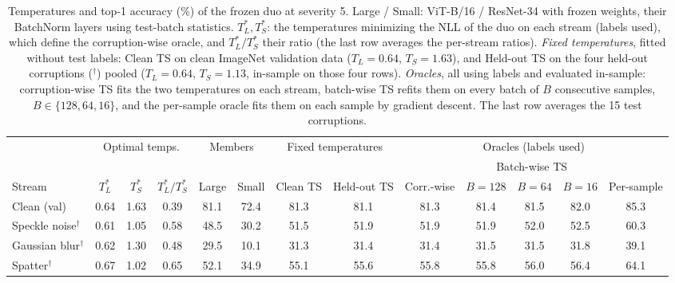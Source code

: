 \begin{table}[t]
    \centering
    \small
    \setlength{\tabcolsep}{4.5pt}
    \caption{Temperatures and top-1 accuracy (\%) of the frozen duo at severity 5. Large / Small: ViT-B/16 / ResNet-34 with frozen weights, their BatchNorm layers using test-batch statistics. $T_L^*, T_S^*$: the temperatures minimizing the NLL of the duo on each stream (labels used), which define the corruption-wise oracle, and $T_L^*/T_S^*$ their ratio (the last row averages the per-stream ratios). \emph{Fixed temperatures}, fitted without test labels: Clean TS on clean ImageNet validation data ($T_L = 0.64$, $T_S = 1.63$), and Held-out TS on the four held-out corruptions ($^\dagger$) pooled ($T_L = 0.64$, $T_S = 1.13$, in-sample on those four rows). \emph{Oracles}, all using labels and evaluated in-sample: corruption-wise TS fits the two temperatures on each stream, batch-wise TS refits them on every batch of $B$ consecutive samples, $B \in \{128, 64, 16\}$, and the per-sample oracle fits them on each sample by gradient descent. The last row averages the 15 test corruptions.}
    \label{tab:temperatures:frozen_bn__vitb16_rn34}
    \label{tab:oracles:frozen_bn__vitb16_rn34}
    \begin{tabular}{l|ccc|cc|cc|ccccc}
        \toprule
        & \multicolumn{3}{c|}{Optimal temps.} & \multicolumn{2}{c|}{Members} & \multicolumn{2}{c|}{Fixed temperatures} & \multicolumn{5}{c}{Oracles (labels used)} \\
         &  &  &  &  &  &  &  &  & \multicolumn{3}{c}{Batch-wise TS} &  \\
        \cmidrule(lr){10-12}
        Stream & $T_L^*$ & $T_S^*$ & $T_L^*/T_S^*$ & Large & Small & Clean TS & Held-out TS & Corr.-wise & $B{=}128$ & $B{=}64$ & $B{=}16$ & Per-sample \\
        \midrule
        Clean (val) & 0.64 & 1.63 & 0.39 & 81.1 & 72.4 & 81.3 & 81.1 & 81.3 & 81.4 & 81.5 & 82.0 & 85.3 \\
        \midrule
        Speckle noise$^\dagger$ & 0.61 & 1.05 & 0.58 & 48.5 & 30.2 & 51.5 & 51.9 & 51.9 & 51.9 & 52.0 & 52.5 & 60.3 \\
        Gaussian blur$^\dagger$ & 0.62 & 1.30 & 0.48 & 29.5 & 10.1 & 31.3 & 31.4 & 31.4 & 31.5 & 31.5 & 31.8 & 39.1 \\
        Spatter$^\dagger$ & 0.67 & 1.02 & 0.65 & 52.1 & 34.9 & 55.1 & 55.6 & 55.8 & 55.8 & 56.0 & 56.4 & 64.1 \\

\end{tabular}
\end{table}

